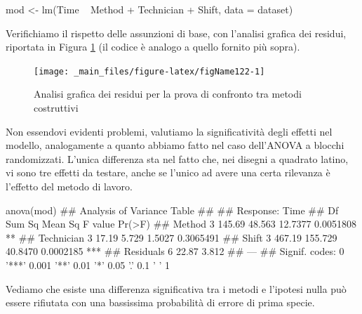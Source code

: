 \documentclass[a4paper,12pt,oneside]{book}
\newenvironment{Shaded}{}{}
\newcommand{\KeywordTok}[1]{#1}
\newcommand{\DataTypeTok}[1]{#1}
\newcommand{\StringTok}[1]{#1}
\newcommand{\CommentTok}[1]{#1}
\newcommand{\OperatorTok}[1]{#1}
\newcommand{\NormalTok}[1]{#1}
\begin{document}
\begin{Shaded}
\begin{Highlighting}[]
\NormalTok{mod <-}\StringTok{ }\KeywordTok{lm}\NormalTok{(Time }\OperatorTok{~}\StringTok{ }\NormalTok{Method }\OperatorTok{+}\StringTok{ }\NormalTok{Technician}
          \OperatorTok{+}\StringTok{ }\NormalTok{Shift, }\DataTypeTok{data =}\NormalTok{ dataset)}
\end{Highlighting}
\end{Shaded}

Verifichiamo il rispetto delle assunzioni di base, con l'analisi grafica dei residui, riportata in Figura \ref{fig:figName122} (il codice è analogo a quello fornito più sopra).

\begin{figure}

{\centering \texttt{[image: \_main\_files/figure-latex/figName122-1]} 

}

\caption{Analisi grafica dei residui per la prova di confronto tra metodi costruttivi}\label{fig:figName122}
\end{figure}

Non essendovi evidenti problemi, valutiamo la significatività degli effetti nel modello, analogamente a quanto abbiamo fatto nel caso dell'ANOVA a blocchi randomizzati. L'unica differenza sta nel fatto che, nei disegni a quadrato latino, vi sono tre effetti da testare, anche se l'unico ad avere una certa rilevanza è l'effetto del metodo di lavoro.

\begin{Shaded}
\begin{Highlighting}[]
\KeywordTok{anova}\NormalTok{(mod)}
\CommentTok{## Analysis of Variance Table}
\CommentTok{## }
\CommentTok{## Response: Time}
\CommentTok{##            Df Sum Sq Mean Sq F value    Pr(>F)    }
\CommentTok{## Method      3 145.69  48.563 12.7377 0.0051808 ** }
\CommentTok{## Technician  3  17.19   5.729  1.5027 0.3065491    }
\CommentTok{## Shift       3 467.19 155.729 40.8470 0.0002185 ***}
\CommentTok{## Residuals   6  22.87   3.812                      }
\CommentTok{## ---}
\CommentTok{## Signif. codes:  0 '***' 0.001 '**' 0.01 '*' 0.05 '.' 0.1 ' ' 1}
\end{Highlighting}
\end{Shaded}

Vediamo che esiste una differenza significativa tra i metodi e l'ipotesi nulla può essere rifiutata con una bassissima probabilità di errore di prima specie.
\end{document}
